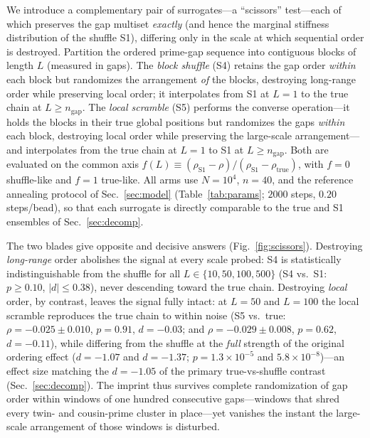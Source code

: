 \documentclass[11pt]{article}
\begin{document}
We introduce a complementary pair of surrogates---a ``scissors'' test---each of which
preserves the gap multiset \emph{exactly} (and hence the marginal stiffness
distribution of the shuffle S1), differing only in the scale at which sequential
order is destroyed. Partition the ordered prime-gap sequence into contiguous blocks
of length $L$ (measured in gaps). The \emph{block shuffle} (S4) retains the gap order
\emph{within} each block but randomizes the arrangement \emph{of} the blocks,
destroying long-range order while preserving local order; it interpolates from S1 at
$L=1$ to the true chain at $L \ge n_{\mathrm{gap}}$. The \emph{local scramble} (S5)
performs the converse operation---it holds the blocks in their true global positions
but randomizes the gaps \emph{within} each block, destroying local order while
preserving the large-scale arrangement---and interpolates from the true chain at
$L=1$ to S1 at $L \ge n_{\mathrm{gap}}$. Both are evaluated on the common axis
$f(L) \equiv (\rho_{\mathrm{S1}}-\rho)/(\rho_{\mathrm{S1}}-\rho_{\mathrm{true}})$,
with $f=0$ shuffle-like and $f=1$ true-like. All arms use $N=10^{4}$, $n=40$, and the
reference annealing protocol of Sec.~\ref{sec:model} (Table~\ref{tab:params};
$2000$ steps, $0.20$ steps/bead), so that each surrogate is directly comparable to
the true and S1 ensembles of Sec.~\ref{sec:decomp}.

The two blades give opposite and decisive answers (Fig.~\ref{fig:scissors}).
Destroying \emph{long-range} order abolishes the signal at every scale probed: S4 is
statistically indistinguishable from the shuffle for all $L \in \{10,50,100,500\}$
(S4 vs.\ S1: $p \ge 0.10$, $|d| \le 0.38$), never descending toward the true chain.
Destroying \emph{local} order, by contrast, leaves the signal fully intact: at $L=50$
and $L=100$ the local scramble reproduces the true chain to within noise (S5 vs.\
true: $\rho = -0.025 \pm 0.010$, $p = 0.91$, $d = -0.03$; and
$\rho = -0.029 \pm 0.008$, $p = 0.62$, $d = -0.11$), while differing from the shuffle
at the \emph{full} strength of the original ordering effect ($d = -1.07$ and
$d = -1.37$; $p = 1.3\times10^{-5}$ and $5.8\times10^{-8}$)---an effect size matching
the $d = -1.05$ of the primary true-vs-shuffle contrast (Sec.~\ref{sec:decomp}). The
imprint thus survives complete randomization of gap order within windows of one
hundred consecutive gaps---windows that shred every twin- and cousin-prime cluster in
place---yet vanishes the instant the large-scale arrangement of those windows is
disturbed.
\end{document}

